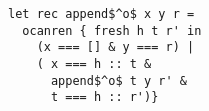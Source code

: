 \begin{lstlisting}
let rec append$^o$ x y r =
  ocanren { fresh h t r' in
    (x === [] & y === r) |
    ( x === h :: t &
      append$^o$ t y r' &
      t === h :: r')}
\end{lstlisting}